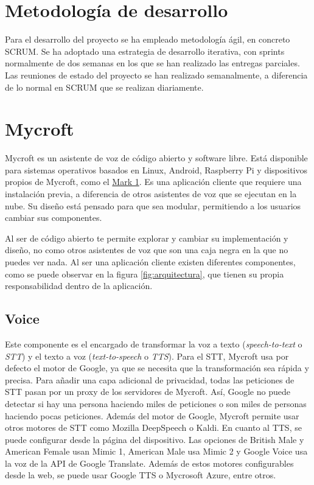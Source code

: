\section{Metodología de desarrollo}

Para el desarrollo del proyecto se ha empleado metodología ágil, en concreto SCRUM. Se ha adoptado una estrategia de desarrollo iterativa, con sprints normalmente de dos semanas en los que se han realizado las entregas parciales. Las reuniones de estado del proyecto se han realizado semanalmente, a diferencia de lo normal en SCRUM que se realizan diariamente.

\section{Mycroft}

Mycroft\cite{MycroftSoftware2019} es un asistente de voz de código abierto y software libre. Está disponible para sistemas operativos basados en Linux, Android, Raspberry Pi y dispositivos propios de Mycroft, como el \href{https://mycroft.ai/product/mycroft-mark-1/}{Mark 1}. Es una aplicación cliente que requiere una instalación previa, a diferencia de otros asistentes de voz que se ejecutan en la nube. Su diseño está pensado para que sea modular, permitiendo a los usuarios cambiar sus componentes.

Al ser de código abierto te permite explorar y cambiar su implementación y diseño, no como otros asistentes de voz que son una caja negra en la que no puedes ver nada. Al ser una aplicación cliente existen diferentes componentes, como se puede observar en la figura \ref{fig:arquitectura}, que tienen su propia responsabilidad dentro de la aplicación.

\subsection{Voice\cite{TechnologyOverview}}

Este componente es el encargado de transformar la voz a texto (\textit{speech-to-text} o \textit{STT}) y el texto a voz (\textit{text-to-speech} o \textit{TTS}).
Para el STT, Mycroft usa por defecto el motor de Google, ya que se necesita que la transformación sea rápida y precisa. Para añadir una capa adicional de privacidad, todas las peticiones de STT pasan por un proxy de los servidores de Mycroft. Así, Google no puede detectar si hay una persona haciendo miles de peticiones o son miles de personas haciendo pocas peticiones. Además del motor de Google, Mycroft permite usar otros motores de STT como Mozilla DeepSpeech o Kaldi.
En cuanto al TTS, se puede configurar desde la página del dispositivo. Las opciones de British Male y American Female usan Mimic 1, American Male usa Mimic 2 y Google Voice usa la voz de la API de Google Translate. Además de estos motores configurables desde la web, se puede usar Google TTS o Mycrosoft Azure, entre otros.

